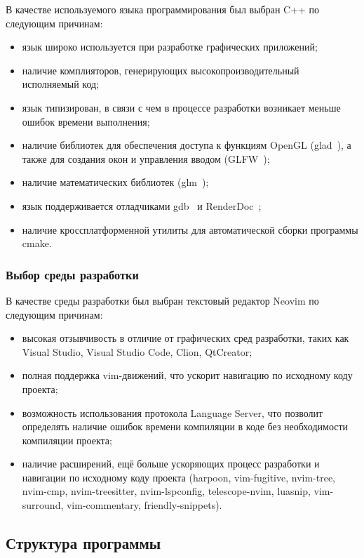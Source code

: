 В качестве используемого языка программирования был выбран C++ по следующим причинам:
\begin{itemize}
    \item язык широко используется при разработке графических приложений;
    \item наличие комплияторов, генерирующих высокопроизводительный исполняемый код;
    \item язык типизирован, в связи с чем в процессе разработки возникает меньше ошибок времени выполнения;
    \item наличие библиотек для обеспечения доступа к функциям OpenGL (glad~\cite{glad}), а также для создания окон и управления вводом (GLFW~\cite{glfw});
    \item наличие математических библиотек (glm~\cite{glm});
    \item язык поддерживается отладчиками gdb~\cite{gdb} и RenderDoc~\cite{rd};
    \item наличие кроссплатформенной утилиты для автоматической сборки программы cmake.
\end{itemize}

\subsubsection{Выбор среды разработки}

В качестве среды разработки был выбран текстовый редактор Neovim \cite{nvim} по следующим причинам:
\begin{itemize}
    \item высокая отзывчивость в отличие от графических сред разработки, таких как Visual Studio, Visual Studio Code, Clion, QtCreator;
    \item полная поддержка vim-движений, что ускорит навигацию по исходному коду проекта;
    \item возможность использования протокола Language Server, что позволит определять наличие ошибок времени компиляции в коде без необходимости компиляции проекта;
    \item наличие расширений, ещё больше ускоряющих процесс разработки и навигации по исходному коду проекта (harpoon, vim-fugitive, nvim-tree, nvim-cmp, nvim-treesitter, nvim-lspconfig, telescope-nvim, luasnip, vim-surround, vim-commentary, friendly-snippets).
\end{itemize}

\subsection{Структура программы}

